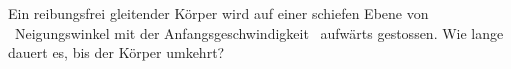 Ein reibungsfrei gleitender Körper wird auf einer schiefen Ebene von \wiO\ Neigungswinkel mit der Anfangsgeschwindigkeit \vAnO\ aufwärts gestossen. Wie lange dauert es, bis der Körper umkehrt?
